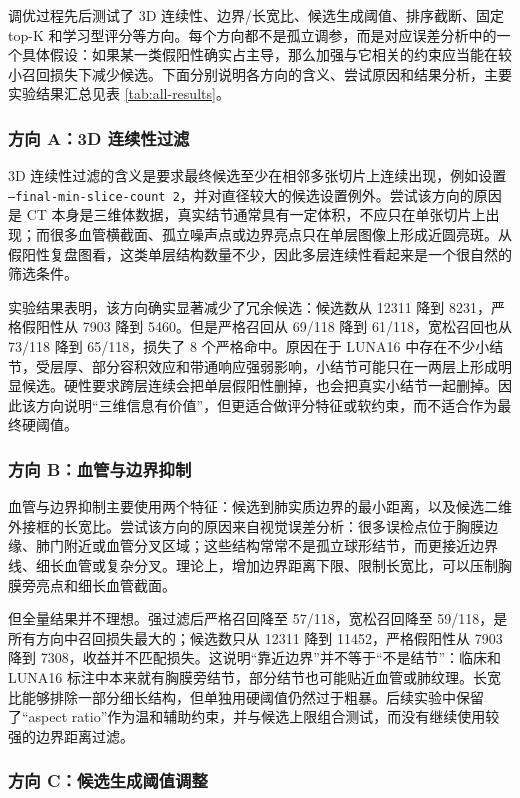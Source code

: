 \documentclass[UTF8,zihao=-4,fontset=none]{ctexart}
\newcommand{\code}[1]{\texttt{#1}}
\begin{document}
调优过程先后测试了 3D 连续性、边界/长宽比、候选生成阈值、排序截断、固定 top-K 和学习型评分等方向。每个方向都不是孤立调参，而是对应误差分析中的一个具体假设：如果某一类假阳性确实占主导，那么加强与它相关的约束应当能在较小召回损失下减少候选。下面分别说明各方向的含义、尝试原因和结果分析，主要实验结果汇总见表 \ref{tab:all-results}。

\subsubsection{方向 A：3D 连续性过滤}

3D 连续性过滤的含义是要求最终候选至少在相邻多张切片上连续出现，例如设置 \code{--final-min-slice-count 2}，并对直径较大的候选设置例外。尝试该方向的原因是 CT 本身是三维体数据，真实结节通常具有一定体积，不应只在单张切片上出现；而很多血管横截面、孤立噪声点或边界亮点只在单层图像上形成近圆亮斑。从假阳性复盘图看，这类单层结构数量不少，因此多层连续性看起来是一个很自然的筛选条件。

实验结果表明，该方向确实显著减少了冗余候选：候选数从 12311 降到 8231，严格假阳性从 7903 降到 5460。但是严格召回从 69/118 降到 61/118，宽松召回也从 73/118 降到 65/118，损失了 8 个严格命中。原因在于 LUNA16 中存在不少小结节，受层厚、部分容积效应和带通响应强弱影响，小结节可能只在一两层上形成明显候选。硬性要求跨层连续会把单层假阳性删掉，也会把真实小结节一起删掉。因此该方向说明“三维信息有价值”，但更适合做评分特征或软约束，而不适合作为最终硬阈值。

\subsubsection{方向 B：血管与边界抑制}

血管与边界抑制主要使用两个特征：候选到肺实质边界的最小距离，以及候选二维外接框的长宽比。尝试该方向的原因来自视觉误差分析：很多误检点位于胸膜边缘、肺门附近或血管分叉区域；这些结构常常不是孤立球形结节，而更接近边界线、细长血管或复杂分叉。理论上，增加边界距离下限、限制长宽比，可以压制胸膜旁亮点和细长血管截面。

但全量结果并不理想。强过滤后严格召回降至 57/118，宽松召回降至 59/118，是所有方向中召回损失最大的；候选数只从 12311 降到 11452，严格假阳性从 7903 降到 7308，收益并不匹配损失。这说明“靠近边界”并不等于“不是结节”：临床和 LUNA16 标注中本来就有胸膜旁结节，部分结节也可能贴近血管或肺纹理。长宽比能够排除一部分细长结构，但单独用硬阈值仍然过于粗暴。后续实验中保留了“aspect ratio”作为温和辅助约束，并与候选上限组合测试，而没有继续使用较强的边界距离过滤。

\subsubsection{方向 C：候选生成阈值调整}
\end{document}
